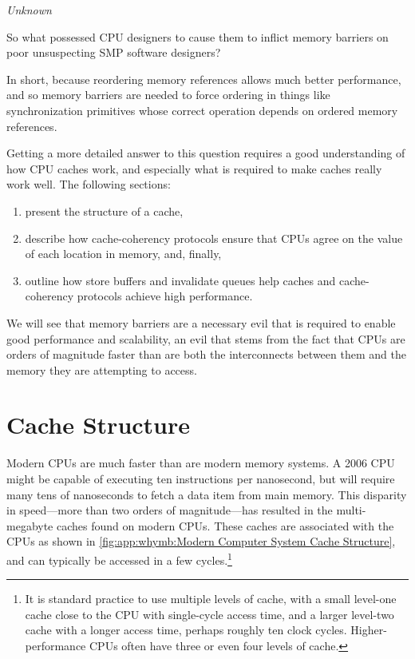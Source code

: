 
%
	 {\emph{Unknown}}

So what possessed CPU designers to cause them to inflict memory barriers
on poor unsuspecting SMP software designers?

In short, because reordering memory references allows much better performance,
and so memory barriers are needed to force ordering in things like
synchronization primitives whose correct operation depends on ordered
memory references.

Getting a more detailed answer to this question requires a good understanding
of how CPU caches work, and especially what is required to make
caches really work well.
The following sections:
\begin{enumerate}
\item	present the structure of a cache,
\item	describe how cache-coherency protocols ensure that CPUs agree
	on the value of each location in memory, and, finally,
\item	outline how store buffers and invalidate queues help
	caches and cache-coherency protocols achieve high performance.
\end{enumerate}
We will see that memory barriers are a necessary evil that is required
to enable good performance and scalability, an evil that stems from
the fact that CPUs are orders of magnitude faster than are both the
interconnects between them and the memory they are attempting to access.

\section{Cache Structure}
\label{sec:app:whymb:Cache Structure}

Modern CPUs are much faster than are modern memory systems.
A 2006 CPU might be capable of executing ten instructions per nanosecond,
but will require many tens of nanoseconds to fetch a data item from
main memory.
This disparity in speed---more than two orders of magnitude---has
resulted in the multi-megabyte caches found on modern CPUs.
These caches are associated with the CPUs as shown in
\cref{fig:app:whymb:Modern Computer System Cache Structure},
and can typically be accessed in a few cycles.\footnote{
	It is standard practice to use multiple levels of cache,
	with a small level-one cache close to the CPU with
	single-cycle access time, and a larger level-two cache
	with a longer access time, perhaps roughly ten clock cycles.
	Higher-performance CPUs often have three or even four levels
	of cache.}

